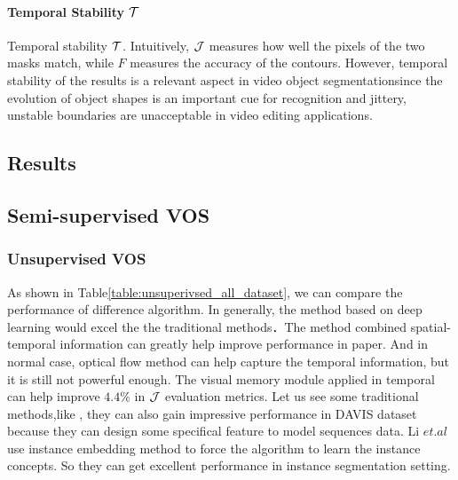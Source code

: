 \paragraph{Temporal Stability $\mathcal{T}$}
Temporal stability $\mathcal{T}$. Intuitively, $\mathcal{J}$ measures how well the pixels of the two masks match, while $F$ measures the
accuracy of the contours. However, temporal stability of the results is a relevant aspect in video object segmentationsince the evolution of object shapes is an important cue for
recognition and jittery, unstable boundaries are unacceptable in video editing applications. 

\subsection{Results}
\subsection{Semi-supervised VOS}



\subsubsection{Unsupervised VOS}
As shown in Table\ref{table:unsuperivsed_all_dataset}, we can compare the performance of difference algorithm. In generally, the method based on deep learning would excel the the traditional 
methods．The method combined spatial-temporal information can greatly help improve performance in paper\cite{Tokmakov2017Learning}. And in normal case, optical flow method can help capture the 
temporal information, but it is still not powerful enough. The visual memory module applied in temporal can help improve $4.4\%$ in $\mathcal{J}$ evaluation metrics. Let us see some traditional methods,like
\cite{Koh2017Primary,li2018instance}, they can also gain impressive performance in DAVIS dataset because they can design some specifical feature to model sequences data. Li $et.al$ use instance embedding method
to force the algorithm to learn the instance concepts. So they can get excellent performance in instance segmentation setting.

